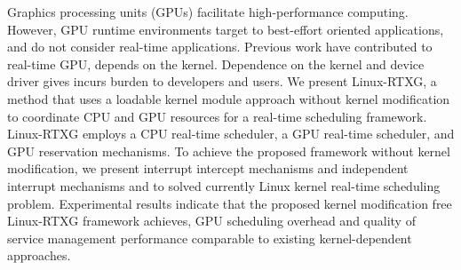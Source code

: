 Graphics processing units (GPUs) facilitate high-performance computing.
However, GPU runtime environments target to best-effort oriented applications, and do not consider real-time applications.
Previous work have contributed to real-time GPU, depends on the kernel.
Dependence on the kernel and device driver gives incurs burden to developers and users.
We present Linux-RTXG, a method that uses a loadable kernel module approach without kernel modification to coordinate CPU and GPU resources for a real-time scheduling framework.
Linux-RTXG employs a CPU real-time scheduler, a GPU real-time scheduler, and GPU reservation mechanisms.
To achieve the proposed framework without kernel modification,
we present interrupt intercept mechanisms and independent interrupt mechanisms and to solved currently Linux kernel real-time scheduling problem.
Experimental results indicate that the proposed kernel modification free Linux-RTXG framework achieves, GPU scheduling overhead and quality of service management performance comparable to existing kernel-dependent approaches.
